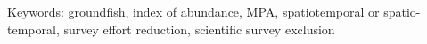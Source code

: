 \documentclass[12pt]{article}
\begin{document}

\vspace{5mm}
\noindent
Keywords:
groundfish,
index of abundance,
MPA,
spatiotemporal or spatio-temporal,
survey effort reduction,
scientific survey exclusion


%
\end{document}

